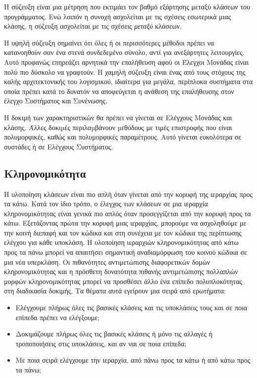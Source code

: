 \documentclass[12pt]{article}
\begin{document}
\par Η σύζευξη είναι μια μέτρηση που εκτιμάει τον βαθμό εξάρτησης μεταξύ κλάσεων του προγράμματος. Ενώ λοιπόν η συνοχή ασχολείται με τις σχέσεις εσωτερικά μιας κλάσης, η σύζευξη ασχολείται με τις σχέσεις \textit{μεταξύ} κλάσεων.

\par Η υψηλή σύζευξη σημαίνει ότι όλες ή οι περισσότερες μέθοδοι πρέπει να κατανοηθούν σαν ένα στενά συνδεδεμένο σύνολο, αντί για ανεξάρτητες λειτουργίες. Αυτό προφανώς επηρεάζει αρνητικά την επαλήθευση αφού οι Έλεγχοι Μονάδας είναι πολύ πιο δύσκολο να γραφτούν. Η χαμηλή σύζευξη είναι ένας από τους στόχους της καλής αρχιτεκτονικής του λογισμικού, ιδιαίτερα για μεγάλα, περίπλοκα συστήματα στα οποία πρέπει κατά το δυνατόν να αποφεύγεται η ανάθεση της επαλήθευσης στον έλεγχο Συστήματος και Συνένωσης.

\par Η δοκιμή των χαρακτηριστικών θα πρέπει να γίνεται σε Ελέγχους Μονάδας και κλάσης. Άλλες δοκιµές περιλαµβάνουν µεθόδους  με τιμές επιστροφής που είναι πολυμορφικές, καθώς και πολυμορφικές παραμέτρους. Αυτό γίνεται ευκολότερα σε συστάδες ή σε Ελέγχους Συστήματος.

\subsection{Κληρονομικότητα}

Η υλοποίηση κλάσεων είναι πιο απλή όταν γίνεται από την κορυφή της ιεραρχίας προς τα κάτω. Κατά τον ίδιο τρόπο, ο έλεγχος των κλάσεων σε μια ιεραρχία κληρονομικότητας είναι γενικά πιο απλός όταν προσεγγίζεται από την κορυφή προς τα κάτω. Εξετάζοντας πρώτα την κορυφή μιας ιεραρχίας, μπορούμε να ασχοληθούμε με την κοινή διεπαφή και τον κώδικα και στη συνέχεια με τον κώδικα της περίπτωσης ελέγχου για κάθε υποκλάση. Η υλοποίηση ιεραρχιών κληρονομικότητας από κάτω προς τα πάνω μπορεί να απαιτήσει σημαντική αναδιαμόρφωση του κοινού κώδικα σε μια νέα υπερκλάση. Οι πιθανότητες αντιμετώπισης διαφορετικών δομών κληρονομικότητας και η πρόσθετη δυνατότητα πιθανής αντιμετώπισης πολλαπλών μορφών κληρονομικότητας μπορεί να προσθέσει άλλο ένα επίπεδο πολυπλοκότητας στη διαδικασία δοκιμής. Τα θέματα αυτά εγείρουν μια σειρά από ερωτήματα:

\begin{itemize}
\item Ελέγχουμε πλήρως όλες τις βασικές κλάσεις και τις υποκλάσεις τους και σε ποια επίπεδα πρέπει να ελέγξουμε; 
\item Δοκιμάζουμε πλήρως όλες τις βασικές κλάσεις ή μόνο τις αλλαγές ή τροποποιήσεις στις υποκλάσεις, και αν ναι σε ποια επίπεδα;
\item Με ποια σειρά ελέγχουμε την ιεραρχία, από πάνω προς τα κάτω ή από κάτω προς τα πάνω;
\end{itemize}
\end{document}
